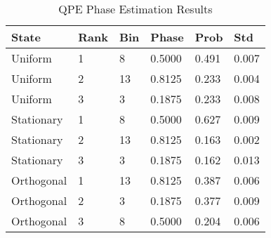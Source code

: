 \begin{table}[h]
\centering
\caption{QPE Phase Estimation Results}
\label{tab:qpe_phases}
\begin{tabular}{llllll}
\toprule
State & Rank & Bin & Phase & Prob & Std \\
\midrule
Uniform & 1 & 8 & 0.5000 & 0.491 & 0.007 \\
Uniform & 2 & 13 & 0.8125 & 0.233 & 0.004 \\
Uniform & 3 & 3 & 0.1875 & 0.233 & 0.008 \\
Stationary & 1 & 8 & 0.5000 & 0.627 & 0.009 \\
Stationary & 2 & 13 & 0.8125 & 0.163 & 0.002 \\
Stationary & 3 & 3 & 0.1875 & 0.162 & 0.013 \\
Orthogonal & 1 & 13 & 0.8125 & 0.387 & 0.006 \\
Orthogonal & 2 & 3 & 0.1875 & 0.377 & 0.009 \\
Orthogonal & 3 & 8 & 0.5000 & 0.204 & 0.006 \\
\bottomrule
\end{tabular}
\end{table}
